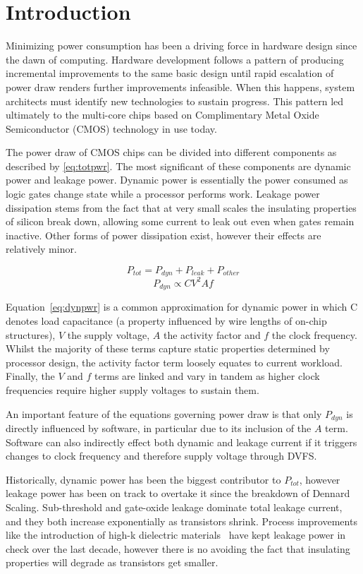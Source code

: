\section{Introduction}

Minimizing power consumption has been a driving force in hardware design since the dawn of computing. Hardware development follows a pattern of producing incremental improvements to the same basic design until rapid escalation of power draw renders further improvements infeasible. When this happens, system architects must identify new technologies to sustain progress. This pattern led ultimately to the multi-core chips based on Complimentary Metal Oxide Semiconductor (CMOS) technology in use today.

The power draw of CMOS chips can be divided into different components as described by \autoref{eq:totpwr}. The most significant of these components are dynamic power and leakage power. Dynamic power is essentially the power consumed as logic gates change state while a processor performs work. Leakage power dissipation stems from the fact that at very small scales the insulating properties of silicon break down, allowing some current to leak out even when gates remain inactive. Other forms of power dissipation exist, however their effects are relatively minor. 


\begin{equation}
\label{eq:totpwr}
P_{tot} = P_{dyn} + P_{leak} + P_{other}
\end{equation}
\begin{equation} 
\label{eq:dynpwr}
P_{dyn} \propto CV^{2}Af
\end{equation}

Equation~\ref{eq:dynpwr} is a common approximation for dynamic power in which C denotes load capacitance (a property influenced by wire lengths of on-chip structures), $V$ the supply voltage, $A$ the activity factor and $f$ the clock frequency. Whilst the majority of these terms capture static properties determined by processor design, the activity factor term loosely equates to current workload. Finally, the $V$ and $f$ terms are linked and vary in tandem as higher clock frequencies require higher supply voltages to sustain them. 


An important feature of the equations governing power draw is that only $P_{dyn}$ is directly influenced by software, in particular due to its inclusion of the $A$ term. Software can also indirectly effect both dynamic and leakage current if it triggers changes to clock frequency and therefore supply voltage through DVFS.  

Historically, dynamic power has been the biggest contributor to $P_{tot}$, however leakage power has been on track to overtake it since the breakdown of Dennard Scaling.  Sub-threshold and gate-oxide leakage dominate total leakage current, and they both increase exponentially as transistors shrink. Process improvements like the introduction of high-k dielectric materials~\cite{jan:2009aa} have kept leakage power in check over the last decade, however there is no avoiding the fact that insulating properties will degrade as transistors get smaller.
